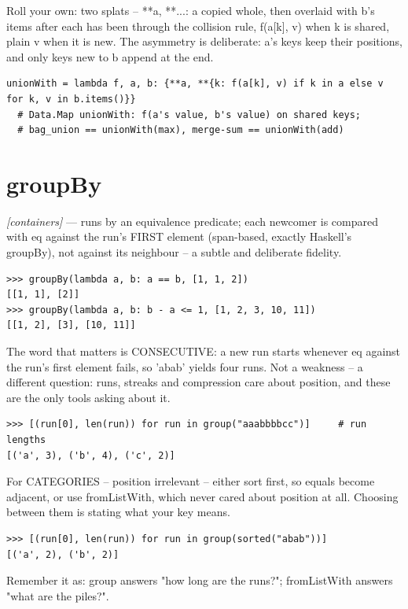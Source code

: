 \documentclass[11pt,letterpaper]{book}
\begin{document}
Roll your own: two splats -- {**a, **{...}}: a copied whole, then overlaid with b's items after each has been through the collision rule, f(a[k], v) when k is shared, plain v when it is new. The asymmetry is deliberate: a's keys keep their positions, and only keys new to b append at the end.

\begin{lstlisting}[style=code]
unionWith = lambda f, a, b: {**a, **{k: f(a[k], v) if k in a else v for k, v in b.items()}}
  # Data.Map unionWith: f(a's value, b's value) on shared keys;
  # bag_union == unionWith(max), merge-sum == unionWith(add)
\end{lstlisting}

\section{groupBy}
\noindent\textit{[containers]} --- runs by an equivalence predicate; each newcomer is compared with eq against the run's FIRST element (span-based, exactly Haskell's groupBy), not against its neighbour -- a subtle and deliberate fidelity.
\begin{lstlisting}[style=spec]
>>> groupBy(lambda a, b: a == b, [1, 1, 2])
[[1, 1], [2]]
>>> groupBy(lambda a, b: b - a <= 1, [1, 2, 3, 10, 11])
[[1, 2], [3], [10, 11]]
\end{lstlisting}

The word that matters is CONSECUTIVE: a new run starts whenever eq against the run's first element fails, so 'abab' yields four runs. Not a weakness -- a different question: runs, streaks and compression care about position, and these are the only tools asking about it.

\begin{lstlisting}[style=spec]
>>> [(run[0], len(run)) for run in group("aaabbbbcc")]     # run lengths
[('a', 3), ('b', 4), ('c', 2)]
\end{lstlisting}

For CATEGORIES -- position irrelevant -- either sort first, so equals become adjacent, or use fromListWith, which never cared about position at all. Choosing between them is stating what your key means.

\begin{lstlisting}[style=spec]
>>> [(run[0], len(run)) for run in group(sorted("abab"))]
[('a', 2), ('b', 2)]
\end{lstlisting}

Remember it as: group answers "how long are the runs?"; fromListWith answers "what are the piles?".
\end{document}
